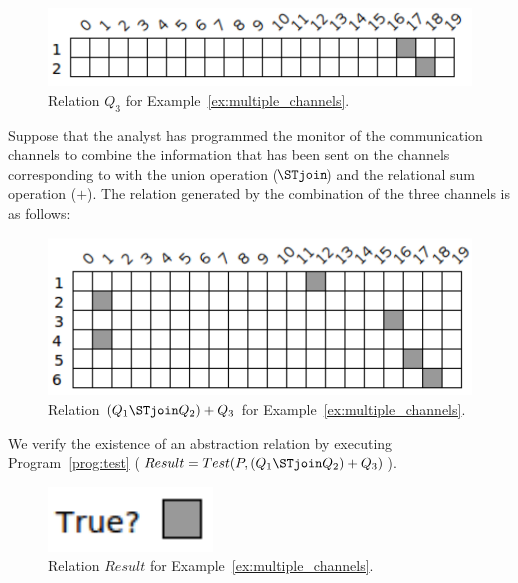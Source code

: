 \begin{example}
	\begin{figure}[ht]
		\centering
		\includegraphics[scale=0.65]{Figures/PDF/Relview/QQ3.pdf}
		\caption{Relation $Q_3$ for Example~\ref{ex:multiple_channels}.}
		\label{fig:multiple_channels_q3}
	\end{figure}

 	Suppose that the analyst has programmed the monitor of the communication channels to combine the information that has been sent on the channels corresponding to with the union operation ( $\!\!\!\STjoin\!\!\!$ ) and the relational sum operation ($+$). The relation generated by the combination of the three channels is as follows: \newline

	\begin{figure}[ht]
		\centering
		\includegraphics[scale=0.65]{Figures/PDF/Relview/Q.pdf}
		\caption{Relation $(Q_1 \STjoin Q_2) + Q_3$ for Example~\ref{ex:multiple_channels}.}
		\label{fig:multiple_channels_q}
	\end{figure}

	We verify the existence of an abstraction relation by executing Program~\ref{prog:test} ($Result = Test(P, (Q_1 \STjoin Q_2) + Q_3)$). \newline

	\begin{figure}[ht]
		\centering
		\includegraphics[scale=0.65]{Figures/PDF/Relview/True.pdf}
		\caption{Relation $Result$ for Example~\ref{ex:multiple_channels}.}
		\label{fig:multiple_channels_result}
	\end{figure}


\end{example}
